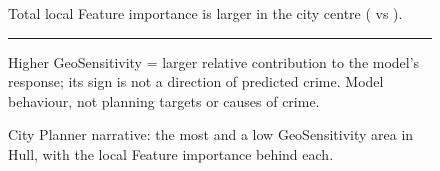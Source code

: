 \begin{figure}[htbp]
\begin{tcolorbox}[enhanced, colback=white, colframe=cardRule, arc=3mm, boxrule=0.6pt,
                  left=5mm, right=5mm, top=4mm, bottom=4mm, fontupper=\sffamily\small\color{cardInk}]
\bigskip
Total local Feature importance is  larger in the city centre
( vs ).

\medskip
{\color{cardRule}\rule{\linewidth}{0.4pt}}\par\smallskip
{\color{cardMuted}\footnotesize Higher GeoSensitivity = larger relative contribution to the model's
response; its sign is not a direction of predicted crime. Model behaviour, not planning targets or
causes of crime.}

\end{tcolorbox}
\caption{City Planner narrative: the most and a low GeoSensitivity area in Hull, with the
local Feature importance behind each.}
\label{fig:stakeholder-planner}
\end{figure}
